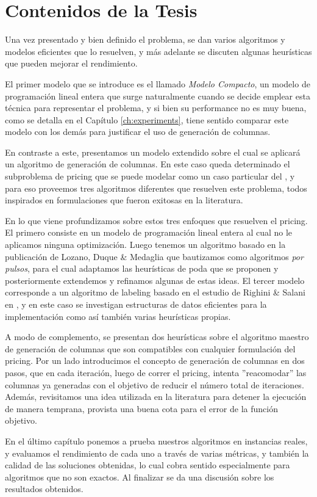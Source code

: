 \section{Contenidos de la Tesis}

Una vez presentado y bien definido el problema, se dan varios algoritmos y modelos eficientes que lo resuelven, y más adelante se discuten algunas heurísticas que pueden mejorar el rendimiento. 

El primer modelo que se introduce es el llamado \emph{Modelo Compacto}, un modelo de programación lineal entera que surge naturalmente cuando se decide emplear esta técnica para representar el problema, y si bien su performance no es muy buena, como se detalla en el Capítulo \ref{ch:experiments}, tiene sentido comparar este modelo con los demás para justificar el uso de generación de columnas.

En contraste a este, presentamos un modelo extendido sobre el cual se aplicará un algoritmo de generación de columnas. En este caso queda determinado el subproblema de pricing que se puede modelar como un caso particular del , y para eso proveemos tres algoritmos diferentes que resuelven este problema, todos inspirados en formulaciones que fueron exitosas en la literatura. 

En lo que viene profundizamos sobre estos tres enfoques que resuelven el pricing. El primero consiste en un modelo de programación lineal entera al cual no le aplicamos ninguna optimización. Luego tenemos un algoritmo basado en la publicación de Lozano, Duque \& Medaglia \cite{lozano-duque-medaglia} que bautizamos como algoritmos \emph{por pulsos}, para el cual adaptamos las heurísticas de poda que se proponen y posteriormente extendemos y refinamos algunas de estas ideas. El tercer modelo corresponde a un algoritmo de labeling basado en el estudio de Righini \& Salani en \cite{righini-salani}, y en este caso se investigan estructuras de datos eficientes para la implementación como así también varias heurísticas propias. 

A modo de complemento, se presentan dos heurísticas sobre el algoritmo maestro de generación de columnas que son compatibles con cualquier formulación del pricing. Por un lado introducimos el concepto de generación de columnas en dos pasos, que en cada iteración, luego de correr el pricing, intenta ''reacomodar'' las columnas ya generadas con el objetivo de reducir el número total de iteraciones. Además, revisitamos una idea utilizada en la literatura para detener la ejecución de manera temprana, provista una buena cota para el error de la función objetivo.

En el último capítulo ponemos a prueba nuestros algoritmos en instancias reales, y evaluamos el rendimiento de cada uno a través de varias métricas, y también la calidad de las soluciones obtenidas, lo cual cobra sentido especialmente para algoritmos que no son exactos. Al finalizar se da una discusión sobre los resultados obtenidos.
